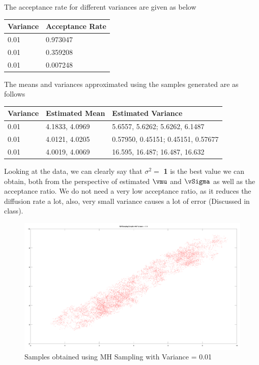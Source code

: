 \documentclass{article}
\begin{document}
\begin{question}

	The acceptance rate for different variances are given as below \br%

	\begin{center}

		\def\arraystretch{1.8}
		\begin{tabular}[h!]{p{3cm} p{4cm}}
			\textbf{Variance}	&	\textbf{Acceptance Rate}	\\
			\hline%
			0.01				&	0.973047					\\
			0.01				&	0.359208					\\
			0.01				&	0.007248					\\
		\end{tabular}

	\end{center} \br%

	The means and variances approximated using the samples generated are as follows \br%
	
	\begin{center}

		\def\arraystretch{1.8}
		\begin{tabular}[h!]{p{3cm} p{4cm} p{7cm}}
			\textbf{Variance}	&	\textbf{Estimated Mean}	&	\textbf{Estimated Variance}			\\
			\hline%
			0.01				&	4.1833, 4.0969			&	5.6557, 5.6262; 5.6262, 6.1487		\\
			0.01				&	4.0121, 4.0205			&	0.57950, 0.45151; 0.45151, 0.57677	\\
			0.01				&	4.0019, 4.0069			&	16.595, 16.487; 16.487, 16.632		\\
		\end{tabular}

	\end{center} \br%

	Looking at the data, we can clearly say that $\sigma^2 =$ \textbf{1} is the best value we can obtain, both from the perspective of estimated $\vmu$ and $\vSigma$ as well as the acceptance ratio. We do not need a very low acceptance ratio, as it reduces the diffusion rate a lot, also, very small variance causes a lot of error (Discussed in class).

	\begin{figure}[h!]
		\centering
		\includegraphics[width=15cm]{plots/samples1.png}
		\caption{Samples obtained using MH Sampling with Variance = 0.01}
	\end{figure}
	

\end{question}
\end{document}
